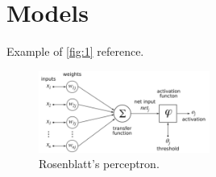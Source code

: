 
\chapter{Models}
\label{chp:models}

Example of \autoref{fig:1} reference.

\begin{figure}
    \captionsetup{justification=centering}
    \centering
    \includegraphics[width=0.5\textwidth]{figures/perceptron.png}
    \caption{Rosenblatt's perceptron.}
    \label{fig:1}
\end{figure}
